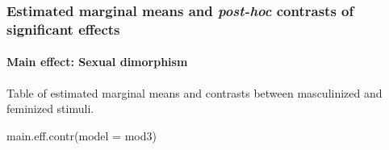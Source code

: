 \documentclass[
  bookmarksnumbered]{article}
\newenvironment{Shaded}{\begin{snugshade}}{\end{snugshade}}
\newcommand{\AttributeTok}[1]{\textcolor[rgb]{0.80,0.80,0.80}{#1}}
\newcommand{\FunctionTok}[1]{\textcolor[rgb]{0.94,0.94,0.56}{#1}}
\newcommand{\NormalTok}[1]{\textcolor[rgb]{0.80,0.80,0.80}{#1}}
\begin{document}
\begin{table}[H]
\centering
\caption{\label{tab:tab-mod3}ANOVA-type table of fixed effects for the NF model}
\centering
{}
\end{table}

\subsubsection{\texorpdfstring{Estimated marginal means and \emph{post-hoc} contrasts of significant effects}{Estimated marginal means and post-hoc contrasts of significant effects}}\label{estimated-marginal-means-and-post-hoc-contrasts-of-significant-effects-2}

\paragraph{Main effect: Sexual dimorphism}\label{main-effect-sexual-dimorphism-2}

Table of estimated marginal means and contrasts between masculinized and feminized stimuli.

\begin{Shaded}
\begin{Highlighting}[]
\FunctionTok{main.eff.contr}\NormalTok{(}\AttributeTok{model =}\NormalTok{ mod3)}
\end{Highlighting}
\end{Shaded}
\end{document}
